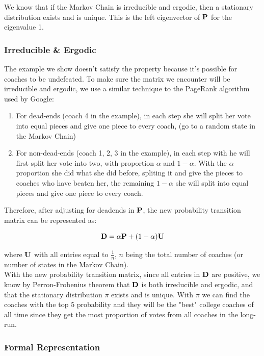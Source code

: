 \documentclass[titlepage,11pt]{article}
\begin{document}
\noindent We know that if the Markov Chain is irreducible and ergodic, then a stationary distribution exists and is unique. This is the left eigenvector of $\bf{P}$ for the eigenvalue 1.


\subsubsection*{Irreducible \& Ergodic}

\noindent The example we show doesn't satisfy the property because it's possible for coaches to be undefeated. To make sure the matrix we encounter will be irreducible and ergodic, we use a similar technique to the PageRank algorithm used by Google:

\begin{enumerate}
\item For dead-ends (coach 4 in the example), in each step she will split her vote into equal pieces and give one piece to every coach, (go to a random state in the Markov Chain)
\item For non-dead-ends (coach 1, 2, 3 in the example), in each step with he will first split her vote into two, with proportion $\alpha$ and $1 - \alpha$. With the $\alpha$ proportion she did what she did before, spliting it and give the pieces to coaches who have beaten her, the remaining $1 - \alpha$ she will split into equal pieces and give one piece to every coach.
\end{enumerate}

\noindent Therefore, after adjusting for deadends in ${\bf P}$, the new probability transition matrix can be represented as:

$${\bf D} = \alpha {\bf P} + (1 - \alpha) {\bf U}$$

\noindent where $\bf{U}$ with all entries equal to $\frac{1}{n}$, $n$ being the total number of coaches (or number of states in the Markov Chain).
\\

\noindent With the new probability transition matrix, since all entries in $\bf{D}$ are positive, we know by Perron-Frobenius theorem that $\bf{D}$ is both irreducible and ergodic, and that the stationary distribution $\pi$ exists and is unique. With $\pi$ we can find the coaches with the top $5$ probability and they will be the "best" college coaches of all time since they get the most proportion of votes from all coaches in the long-run.

\subsubsection*{Formal Representation}
\end{document}
